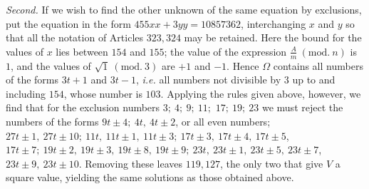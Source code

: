 \textit{Second.} If we wish to find the other unknown of the same equation by exclusions, put the equation in the form \(455xx+3yy=10857362\), interchanging \(x\) and \(y\) so that all the notation of Articles \(323,\allowbreak 324\) may be retained. Here the bound for the values of \(x\) lies between \(154\) and \(155\); the value of the expression \(\frac Am\ (\mathrm{mod.}\ n)\) is \(1\), and the values of \(\surd1\ (\mathrm{mod.}\ 3)\) are \(+1\) and \(-1\). Hence \(\Omega\) contains all numbers of the forms \(3t+1\) and \(3t-1\), \textit{i.e.} all numbers not divisible by \(3\) up to and including \(154\), whose number is \(103\). Applying the rules given above, however, we find that for the exclusion numbers \(3;\allowbreak \ 4;\allowbreak \ 9;\allowbreak \ 11;\allowbreak \) \(17;\allowbreak \ 19;\allowbreak \ 23\) we must reject the numbers of the forms \(9t\pm4;\allowbreak \ 4t,\allowbreak \ 4t\pm2\), or all even numbers; \(27t\pm1,\allowbreak \ 27t\pm10;\allowbreak \ 11t,\allowbreak \ 11t\pm1,\allowbreak \ 11t\pm3;\allowbreak \ 17t\pm3,\allowbreak \ 17t\pm4,\allowbreak \ 17t\pm5\), \(17t\pm7;\allowbreak \ 19t\pm2,\allowbreak \ 19t\pm3,\allowbreak \ 19t\pm8,\allowbreak \ 19t\pm9;\allowbreak \ 23t,\allowbreak \ 23t\pm1,\allowbreak \ 23t\pm5,\allowbreak \ 23t\pm7\), \(23t\pm9,\allowbreak \ 23t\pm10\). Removing these leaves \(119,\allowbreak 127\), the only two that give \(V\) a square value, yielding the same solutions as those obtained above.

